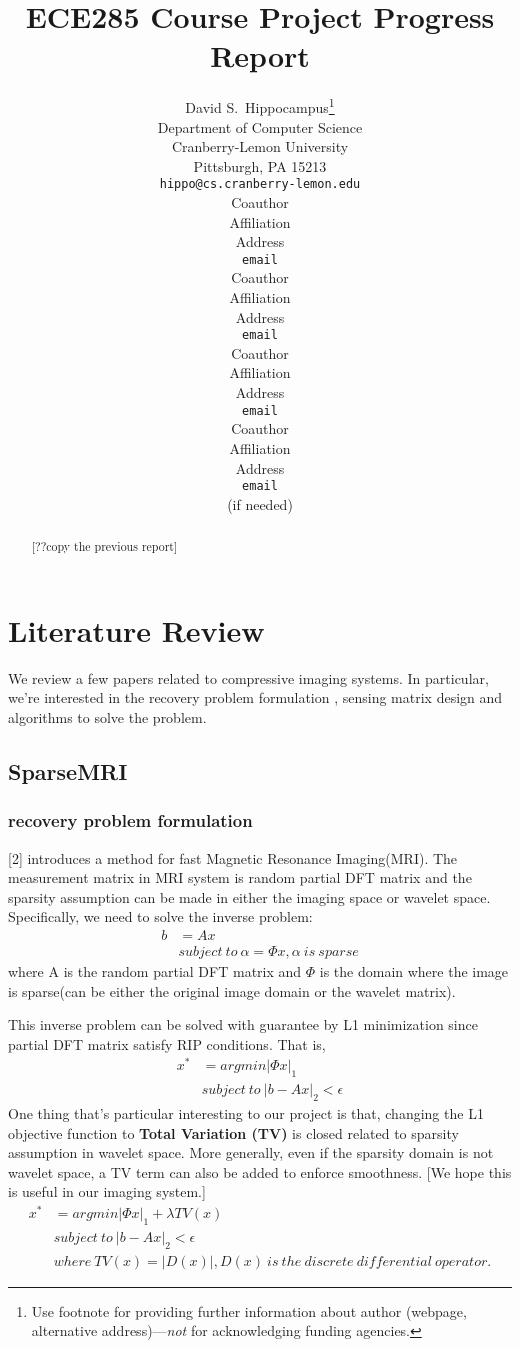\documentclass{article} %
\title{ECE285 Course Project Progress Report}
\author{
David S.~Hippocampus\thanks{ Use footnote for providing further information
about author (webpage, alternative address)---\emph{not} for acknowledging
funding agencies.} \\
Department of Computer Science\\
Cranberry-Lemon University\\
Pittsburgh, PA 15213 \\
\texttt{hippo@cs.cranberry-lemon.edu} \\
\And
Coauthor \\
Affiliation \\
Address \\
\texttt{email} \\
\AND
Coauthor \\
Affiliation \\
Address \\
\texttt{email} \\
\And
Coauthor \\
Affiliation \\
Address \\
\texttt{email} \\
\And
Coauthor \\
Affiliation \\
Address \\
\texttt{email} \\
(if needed)\\
}
\begin{document}
\maketitle

\begin{abstract}
[??copy the previous report]
\end{abstract}

\section{Literature Review}
We review a few papers related to compressive imaging systems. In particular, we're interested in the recovery problem formulation , sensing matrix design and algorithms to solve the problem.
\subsection{SparseMRI}
\subsubsection{recovery problem formulation}
[2] introduces a method for fast Magnetic Resonance Imaging(MRI). The measurement matrix in MRI system is random partial DFT matrix and the sparsity assumption can be made in either the imaging space or wavelet space. Specifically, we need to solve the inverse problem:
\begin{align*}
b&=A x \\
&subject~to~ \alpha=\Phi x,\alpha~is~sparse
\end{align*}
where A is the random partial DFT matrix and $\Phi$ is the domain where the image is sparse(can be either the original image domain or the wavelet matrix).

This inverse problem can be solved with guarantee by L1 minimization since partial DFT matrix satisfy RIP conditions. That is,
\begin{align*}
x^*&=argmin |\Phi x|_1 \\
&subject~to~|b-Ax|_2<\epsilon
\end{align*}
One thing that's particular interesting to our project is that, changing the L1 objective function to \textbf{Total Variation (TV)} is closed related to sparsity assumption in wavelet space. More generally, even if the sparsity domain is not wavelet space, a TV term can also be added to enforce smoothness. [We hope this is useful in our imaging system.]
\begin{align*}
x^*&=argmin |\Phi x|_1+\lambda TV(x) \\
&subject~to~|b-Ax|_2<\epsilon\\
&where~TV(x)=|D(x)|, D(x)~ is~ the~discrete~differential~operator. 
\end{align*}
\end{document}
